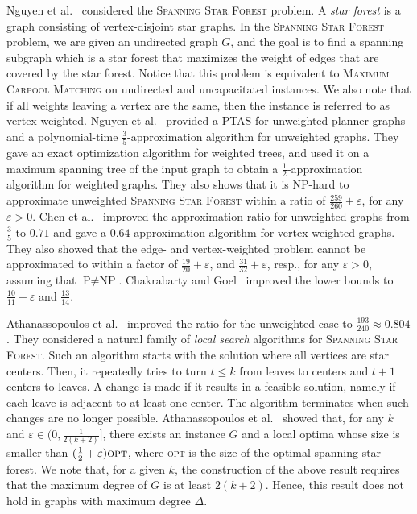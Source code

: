 \documentclass[11pt]{article}
\newcommand{\half}{\frac{1}{2}}
\newcommand{\inv}[1]{\frac{1}{#1}}
\newcommand{\carpool}{\textsc{Maximum Carpool Matching}\xspace}
\newcommand{\eps}{\varepsilon}
\begin{document}
Nguyen et al.~\cite{nguyen2008approximating} considered the
\textsc{Spanning Star Forest} problem.  A \emph{star forest} is a
graph consisting of vertex-disjoint star graphs.  In the
\textsc{Spanning Star Forest} problem, we are given an undirected
graph $G$, and the goal is to find a spanning subgraph which is a star
forest that maximizes the weight of edges that are covered by the star
forest.  Notice that this problem is equivalent to \carpool on
undirected and uncapacitated instances.  We also note that if all
weights leaving a vertex are the same, then the instance is referred
to as vertex-weighted.
%
Nguyen et al.~\cite{nguyen2008approximating} provided a PTAS for
unweighted planner graphs and a polynomial-time
$\frac{3}{5}$-approximation algorithm for unweighted graphs.  They
gave an exact optimization algorithm for weighted trees, and used it
on a maximum spanning tree of the input graph to obtain a
$\frac{1}{2}$-approximation algorithm for weighted graphs.  They also
shows that it is NP-hard to approximate unweighted \textsc{Spanning
Star Forest} within a ratio of $\frac{259}{260}+\eps$, for any
$\eps>0$.
%
%
Chen et al.~\cite{CENRRS13} improved the approximation ratio for
unweighted graphs from $\frac{3}{5}$ to $0.71$ and gave a
$0.64$-approximation algorithm for vertex weighted graphs.  They also
showed that the edge- and vertex-weighted problem cannot be
approximated to within a factor of $\frac{19}{20} + \eps$, and
$\frac{31}{32} + \eps$, resp., for any $\eps > 0$, assuming that
$\text{P} \neq \text{NP}$.
%
Chakrabarty and Goel~\cite{ChakrabartyGoel10} improved the lower bounds
to $\frac{10}{11} + \eps$ and $\frac{13}{14}$.

Athanassopoulos et al.~\cite{ACKK09} improved the ratio for the
unweighted case to $\frac{193}{240} \approx 0.804$.
%
They considered a natural family of \emph{local search} algorithms for
\textsc{Spanning Star Forest}.  Such an algorithm starts with the
solution where all vertices are star centers.  Then, it repeatedly
tries to turn $t \leq k$ from leaves to centers and $t+1$ centers to
leaves.  A change is made if it results in a feasible solution, namely
if each leave is adjacent to at least one center.  The algorithm
terminates when such changes are no longer possible.
%
Athanassopoulos et al.~\cite{ACKK09} showed that, for any $k$ and
$\eps \in (0,\inv{2(k+2)}]$, there exists an instance $G$ and a local
optima whose size is smaller than $(\half + \eps) \textsc{opt}$,
where \textsc{opt} is the size of the optimal spanning star forest.
We note that, for a given $k$, the construction of the above result
requires that the maximum degree of $G$ is at least $2(k+2)$.  Hence,
this result does not hold in graphs with maximum degree $\Delta$.
\end{document}
